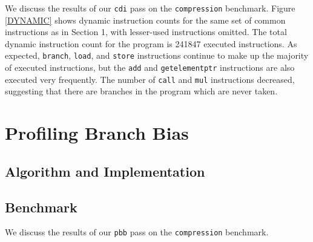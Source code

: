 \documentclass[12pt]{article}
\begin{document}
We discuss the results of our {\tt cdi} pass on the {\tt compression} benchmark. Figure \ref{DYNAMIC} shows dynamic instruction counts for the same set of common instructions as in Section 1, with lesser-used instructions omitted. The total dynamic instruction count for the program is 241847 executed instructions. As expected, {\tt branch}, {\tt load}, and {\tt store} instructions continue to make up the majority of executed instructions, but the {\tt add} and {\tt getelementptr} instructions are also executed very frequently. The number of {\tt call} and {\tt mul} instructions decreased, suggesting that there are branches in the program which are never taken. 

\section{Profiling Branch Bias}

\subsection{Algorithm and Implementation}

\subsection{Benchmark}

We discuss the results of our {\tt pbb} pass on the {\tt compression} benchmark. 
\end{document}
